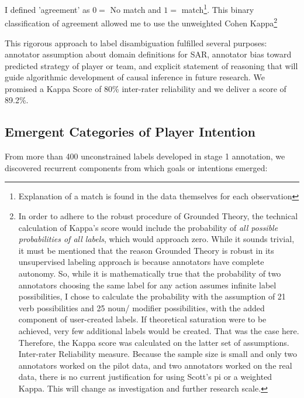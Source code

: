 \documentclass[10pt]{article}
\begin{document}
I defined 'agreement' as $0 = $ No match and $1 =$ match\footnote{Explanation of a match is found in the data themselves for each observation}. This binary classification of agreement allowed me to use the unweighted Cohen Kappa\footnote{In order to adhere to the robust procedure of Grounded Theory, the technical calculation of Kappa's score would include the probability of \textit{all possible probabilities of all labels}, which would approach zero. While it sounds trivial, it must be mentioned that the reason Grounded Theory is robust in its unsupervised labeling approach is because annotators have complete autonomy. So, while it is mathematically true that the probability of two annotators choosing the same label for any action assumes infinite label possibilities, I chose to calculate the probability with the assumption of 21 verb possibilities and 25 noun/ modifier possibilities, with the added component of user-created labels. If theoretical saturation were to be achieved, very few additional labels would be created. That was the case here. Therefore, the Kappa score was calculated on the latter set of assumptions. Inter-rater Reliability measure. Because the sample size is small and only two annotators worked on the pilot data, and two annotators worked on the real data, there is no current justification for using Scott's pi or a weighted Kappa. This will change as investigation and further research scale.}


This rigorous approach to label disambiguation fulfilled several purposes: annotator assumption about domain definitions for SAR, annotator bias toward predicted strategy of player or team, and explicit statement of reasoning that will guide algorithmic development of causal inference in future research. We promised a Kappa Score of 80\% inter-rater reliability and we deliver a score of 89.2\%. 


\subsection{Emergent Categories of Player Intention}
From more than 400 unconstrained labels developed in stage 1 annotation, we discovered recurrent components from which goals or intentions emerged:
\end{document}
